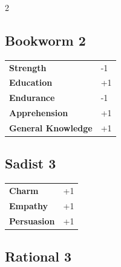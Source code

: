 \begin{multicols}{2}
\begin{tcolorbox}
\end{tcolorbox}

\begin{tcolorbox}
    \subsection*{Bookworm \hfill \small{2 }}
    \tcblower




\begin{tabular}{@{}ll@{}}
    \textbf{Strength} & -1\\
    \textbf{Education} & +1\\
    \textbf{Endurance} & -1\\
    \textbf{Apprehension} & +1\\
    \textbf{General Knowledge} & +1\\
\end{tabular}


\end{tcolorbox}

\begin{tcolorbox}
    \subsection*{Sadist \hfill \small{3 }}
    \tcblower




\begin{tabular}{@{}ll@{}}
    \textbf{Charm} & +1\\
    \textbf{Empathy} & +1\\
    \textbf{Persuasion} & +1\\
\end{tabular}


\end{tcolorbox}

\begin{tcolorbox}
    \subsection*{Rational \hfill \small{3 }}
    \tcblower





\end{tcolorbox}
\end{multicols}
